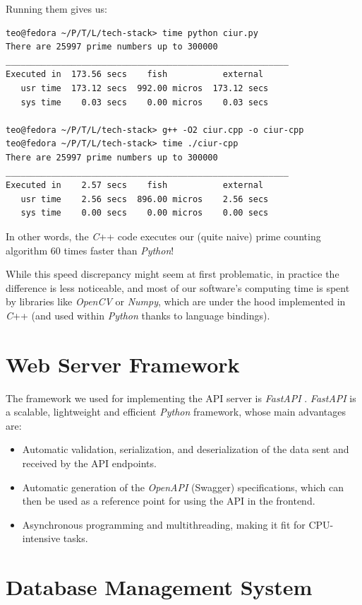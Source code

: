 \documentclass[11pt, a4paper]{report}
\begin{document}
Running them gives us:
\begin{verbatim}
teo@fedora ~/P/T/L/tech-stack> time python ciur.py
There are 25997 prime numbers up to 300000
________________________________________________________
Executed in  173.56 secs    fish           external
   usr time  173.12 secs  992.00 micros  173.12 secs
   sys time    0.03 secs    0.00 micros    0.03 secs

teo@fedora ~/P/T/L/tech-stack> g++ -O2 ciur.cpp -o ciur-cpp
teo@fedora ~/P/T/L/tech-stack> time ./ciur-cpp
There are 25997 prime numbers up to 300000
________________________________________________________
Executed in    2.57 secs    fish           external
   usr time    2.56 secs  896.00 micros    2.56 secs
   sys time    0.00 secs    0.00 micros    0.00 secs
\end{verbatim}

In other words, the \textit{C}++ code executes our (quite naive) prime counting algorithm $60$ times faster than \textit{Python}!

While this speed discrepancy might seem at first problematic, in practice the difference is less noticeable, and most of our software's computing time is spent by libraries like \textit{OpenCV} or \textit{Numpy}, which are under the hood implemented in \textit{C}++ (and used within \textit{Python} thanks to language bindings).

\section{Web Server Framework}

The framework we used for implementing the API server is \textit{FastAPI} \cite{FastAPI}. \textit{FastAPI} is a scalable, lightweight and efficient \textit{Python} framework, whose main advantages are:
\begin{itemize}
    \item Automatic validation, serialization, and deserialization of the data sent and received by the API endpoints.
    \item Automatic generation of the \textit{OpenAPI} \cite{open-api} (Swagger) specifications, which can then be used as a reference point for using the API in the frontend.
    \item Asynchronous programming and multithreading, making it fit for CPU-intensive tasks.
\end{itemize}

\section{Database Management System}
\end{document}
